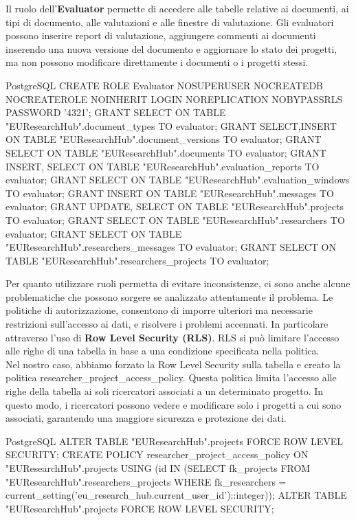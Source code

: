 \documentclass{report}
\begin{document}
Il ruolo dell'\textbf{Evaluator} permette di accedere alle tabelle relative ai documenti, ai tipi di documento, alle valutazioni e alle finestre di valutazione. Gli evaluatori possono inserire report di valutazione, aggiungere commenti  ai documenti inserendo una nuova versione del documento e aggiornare lo stato dei progetti, ma non possono modificare direttamente i documenti o i progetti stessi.
\begin{imtaCode}{PostgreSQL}
CREATE ROLE Evaluator NOSUPERUSER NOCREATEDB NOCREATEROLE NOINHERIT LOGIN NOREPLICATION NOBYPASSRLS PASSWORD '4321';
GRANT SELECT ON TABLE "EUResearchHub".document_types TO evaluator;
GRANT SELECT,INSERT ON TABLE "EUResearchHub".document_versions TO evaluator;
GRANT SELECT ON TABLE "EUResearchHub".documents TO evaluator;
GRANT INSERT, SELECT ON TABLE "EUResearchHub".evaluation_reports TO evaluator;
GRANT SELECT ON TABLE "EUResearchHub".evaluation_windows TO evaluator;
GRANT INSERT ON TABLE "EUResearchHub".messages TO evaluator;
GRANT UPDATE, SELECT ON TABLE "EUResearchHub".projects TO evaluator;
GRANT SELECT ON TABLE "EUResearchHub".researchers TO evaluator;
GRANT SELECT ON TABLE "EUResearchHub".researchers_messages TO evaluator;
GRANT SELECT ON TABLE "EUResearchHub".researchers_projects TO evaluator;
\end{imtaCode}
Per quanto utilizzare ruoli permetta di evitare inconsistenze, ci sono anche alcune problematiche che possono sorgere se analizzato attentamente il problema. 
Le politiche di autorizzazione, consentono di imporre ulteriori ma necessarie restrizioni sull'accesso ai dati, e risolvere i problemi accennati. In particolare attraverso l'uso di \textbf{Row Level Security (RLS)}. RLS si può limitare l'accesso alle righe di una tabella in base a una condizione specificata nella politica.\\
Nel nostro caso, abbiamo forzato la Row Level Security sulla tabella  e creato la politica researcher\_project\_access\_policy. Questa politica limita l'accesso alle righe della tabella  ai soli ricercatori associati a un determinato progetto. In questo modo, i ricercatori possono vedere e modificare solo i progetti a cui sono associati, garantendo una maggiore sicurezza e protezione dei dati.
\begin{imtaCode}{PostgreSQL}
ALTER TABLE "EUResearchHub".projects FORCE ROW LEVEL SECURITY;
CREATE POLICY researcher_project_access_policy
  ON "EUResearchHub".projects
  USING (id IN (SELECT fk_projects FROM "EUResearchHub".researchers_projects WHERE fk_researchers = current_setting('eu_research_hub.current_user_id')::integer));
ALTER TABLE "EUResearchHub".projects FORCE ROW LEVEL SECURITY;
\end{imtaCode}
\end{document}
